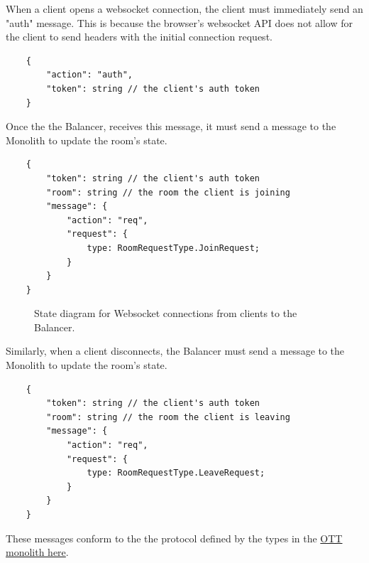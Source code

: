 When a client opens a websocket connection, the client must immediately send an "auth" message. This is because the browser's websocket API does not allow for the client to send headers with the initial connection request.

\begin{verbatim}
	{
		"action": "auth",
		"token": string // the client's auth token
	}
\end{verbatim}

Once the the Balancer, receives this message, it must send a message to the Monolith to update the room's state.

\begin{verbatim}
	{
		"token": string // the client's auth token
		"room": string // the room the client is joining
		"message": {
			"action": "req",
			"request": {
				type: RoomRequestType.JoinRequest;
			}
		}
	}
\end{verbatim}

\begin{figure}[h!]
	\centering
	\caption{State diagram for Websocket connections from clients to the Balancer.}
	\label{fig:client-connection-state}
\end{figure}

Similarly, when a client disconnects, the Balancer must send a message to the Monolith to update the room's state.

\begin{verbatim}
	{
		"token": string // the client's auth token
		"room": string // the room the client is leaving
		"message": {
			"action": "req",
			"request": {
				type: RoomRequestType.LeaveRequest;
			}
		}
	}
\end{verbatim}

These messages conform to the the protocol defined by the types in the \href{https://github.com/dyc3/opentogethertube/blob/master/common/models/messages.ts}{OTT monolith here}.